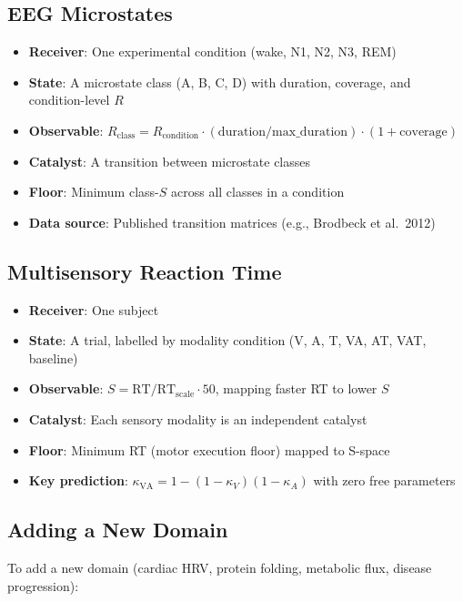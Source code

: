 \documentclass[11pt,a4paper]{article}
\theoremstyle{definition}
\theoremstyle{remark}
\newcommand{\Rorder}{R}
\begin{document}
\subsection{EEG Microstates}

\begin{itemize}[nosep]
\item \textbf{Receiver}: One experimental condition (wake, N1, N2, N3, REM)
\item \textbf{State}: A microstate class (A, B, C, D) with duration, coverage, and condition-level $\Rorder$
\item \textbf{Observable}: $\Rorder_{\mathrm{class}} = \Rorder_{\mathrm{condition}} \cdot (\mathrm{duration}/\mathrm{max\_duration}) \cdot (1 + \mathrm{coverage})$
\item \textbf{Catalyst}: A transition between microstate classes
\item \textbf{Floor}: Minimum class-$S$ across all classes in a condition
\item \textbf{Data source}: Published transition matrices (e.g., Brodbeck et al.\ 2012)
\end{itemize}

\subsection{Multisensory Reaction Time}

\begin{itemize}[nosep]
\item \textbf{Receiver}: One subject
\item \textbf{State}: A trial, labelled by modality condition (V, A, T, VA, AT, VAT, baseline)
\item \textbf{Observable}: $S = \mathrm{RT} / \mathrm{RT}_{\mathrm{scale}} \cdot 50$, mapping faster RT to lower $S$
\item \textbf{Catalyst}: Each sensory modality is an independent catalyst
\item \textbf{Floor}: Minimum RT (motor execution floor) mapped to S-space
\item \textbf{Key prediction}: $\kappa_{\mathrm{VA}} = 1 - (1-\kappa_V)(1-\kappa_A)$ with zero free parameters
\end{itemize}

\subsection{Adding a New Domain}

To add a new domain (cardiac HRV, protein folding, metabolic flux, disease progression):
\end{document}
